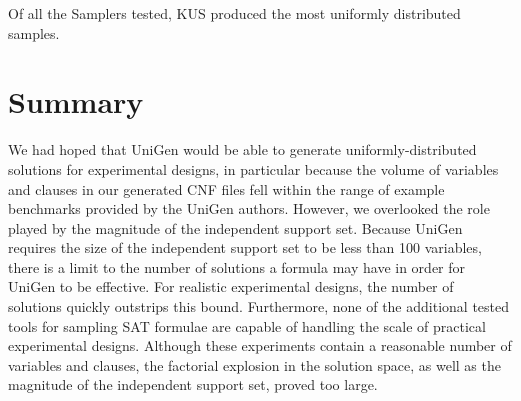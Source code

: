 Of all the Samplers tested, KUS produced the most uniformly distributed samples.

\section{Summary}

We had hoped that UniGen would be able to generate uniformly-distributed solutions for experimental designs, in particular because the volume of variables and clauses in our generated CNF files fell within the range of example benchmarks provided by the UniGen authors. However, we overlooked the role played by the magnitude of the independent support set. Because UniGen requires the size of the independent support set to be less than 100 variables, there is a limit to the number of solutions a formula may have in order for UniGen to be effective. For realistic experimental designs, the number of solutions quickly outstrips this bound. Furthermore, none of the additional tested tools for sampling SAT formulae are capable of handling the scale of practical experimental designs. Although these experiments contain a reasonable number of variables and clauses, the factorial explosion in the solution space, as well as the magnitude of the independent support set, proved too large.
